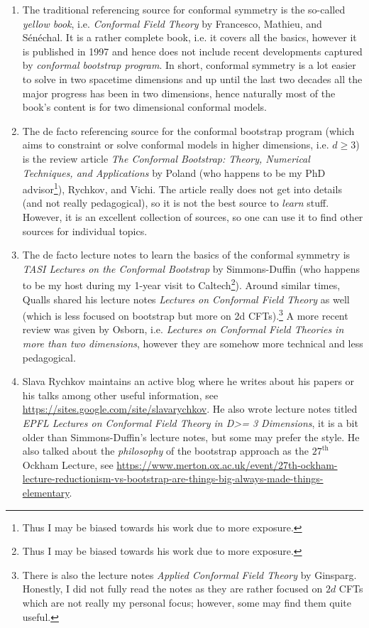 \documentclass[12pt]{article}
\numberwithin{equation}{section}
\begin{document}
\begin{enumerate}
	\item The traditional referencing source for conformal symmetry is the so-called \emph{yellow book}, i.e. \emph{Conformal Field Theory} by Francesco, Mathieu, and Sénéchal. It is a rather complete book, i.e. it covers all the basics, however it is published in 1997 and hence does not include recent developments captured by \emph{conformal bootstrap program}. In short, conformal symmetry is a lot easier to solve in two spacetime dimensions and up until the last two decades all the major progress has been in two dimensions, hence naturally most of the book's content is for two dimensional conformal models.
	\item The de facto referencing source for the conformal bootstrap program (which aims to constraint or solve conformal models in higher dimensions, i.e. $d\ge 3$) is the review article \emph{The Conformal Bootstrap: Theory, Numerical Techniques, and Applications} by Poland (who happens to be my PhD advisor\footnote{Thus I may be biased towards his work due to more exposure.}), Rychkov, and Vichi. The article really does not get into details (and not really pedagogical), so it is not the best source to \emph{learn} stuff. However, it is an excellent collection of sources, so one can use it to find other sources for individual topics.
	\item The de facto lecture notes to learn the basics of the conformal symmetry is \emph{TASI Lectures on the Conformal Bootstrap} by Simmons-Duffin (who happens to be my host during my 1-year visit to Caltech\footnote{Thus I may be biased towards his work due to more exposure.}). Around similar times, Qualls shared his lecture notes \emph{Lectures on Conformal Field Theory} as well (which is less focused on bootstrap but more on 2d CFTs).\footnote{There is also the lecture notes \emph{Applied Conformal Field Theory} by Ginsparg. Honestly, I did not fully read the notes as they are rather focused on $2d$ CFTs which are not really my personal focus; however, some may find them quite useful.} A more recent review was given by Osborn, i.e. \emph{Lectures on Conformal Field Theories in more than two dimensions}, however they are somehow more technical and less pedagogical.
	\item Slava Rychkov maintains an active blog where he writes about his papers or his talks among other useful information, see \hyperref{https://sites.google.com/site/slavarychkov}{}{}{https://sites.google.com/site/slavarychkov}. He also wrote lecture notes titled \emph{EPFL Lectures on Conformal Field Theory in D>= 3 Dimensions}, it is a bit older than Simmons-Duffin's lecture notes, but some may prefer the style. He also talked about the \emph{philosophy} of the bootstrap approach as the $27^{\text{th}}$ Ockham Lecture, see \hyperref{https://www.merton.ox.ac.uk/event/27th-ockham-lecture-reductionism-vs-bootstrap-are-things-big-always-made-things-elementary}{}{}{https://www.merton.ox.ac.uk/event/27th-ockham-lecture-reductionism-vs-bootstrap-are-things-big-always-made-things-elementary}.
	

\end{enumerate}
\end{document}
